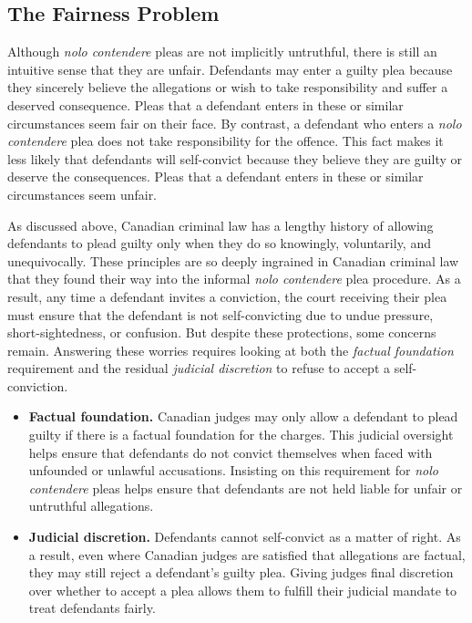 \subsection{The Fairness Problem}

Although \textit{nolo contendere} pleas are not implicitly untruthful, there is still an intuitive sense that they are unfair. Defendants may enter a guilty plea because they sincerely believe the allegations or wish to take responsibility and suffer a deserved consequence. Pleas that a defendant enters in these or similar circumstances seem fair on their face. By contrast, a defendant who enters a \textit{nolo contendere} plea does not take responsibility for the offence. This fact makes it less likely that defendants will self-convict because they believe they are guilty or deserve the consequences. Pleas that a defendant enters in these or similar circumstances seem unfair.

As discussed above, Canadian criminal law has a lengthy history of allowing defendants to plead guilty only when they do so knowingly, voluntarily, and unequivocally. These principles are so deeply ingrained in Canadian criminal law that they found their way into the informal \textit{nolo contendere} plea procedure. As a result, any time a defendant invites a conviction, the court receiving their plea must ensure that the defendant is not self-convicting due to undue pressure, short-sightedness, or confusion. But despite these protections, some concerns remain. Answering these worries requires looking at both the \textit{factual foundation} requirement and the residual \textit{judicial discretion} to refuse to accept a self-conviction.

\begin{itemize}
    \item \textbf{Factual foundation.} Canadian judges may only allow a defendant to plead guilty if there is a factual foundation for the charges. This judicial oversight helps ensure that defendants do not convict themselves when faced with unfounded or unlawful accusations. Insisting on this requirement for \textit{nolo contendere} pleas helps ensure that defendants are not held liable for unfair or untruthful allegations.
    \item \textbf{Judicial discretion.} Defendants cannot self-convict as a matter of right. As a result, even where Canadian judges are satisfied that allegations are factual, they may still reject a defendant's guilty plea. Giving judges final discretion over whether to accept a plea allows them to fulfill their judicial mandate to treat defendants fairly.
\end{itemize}

